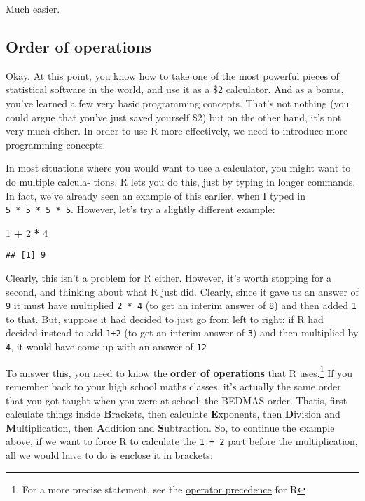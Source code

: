 \documentclass[]{book}
\newenvironment{Shaded}{\begin{snugshade}}{\end{snugshade}}
\newcommand{\DecValTok}[1]{\textcolor[rgb]{0.00,0.00,0.81}{#1}}
\newcommand{\OperatorTok}[1]{\textcolor[rgb]{0.81,0.36,0.00}{\textbf{#1}}}
\newcommand{\StringTok}[1]{\textcolor[rgb]{0.31,0.60,0.02}{#1}}
\let\rmarkdownfootnote\footnote%
\def\footnote{\protect\rmarkdownfootnote}
\begin{document}
Much easier.

\hypertarget{order-of-operations}{%
\subsection{Order of operations}\label{order-of-operations}}

Okay. At this point, you know how to take one of the most powerful pieces of statistical software in the world, and use it as a \$2 calculator. And as a bonus, you've learned a few very basic programming concepts. That's not nothing (you could argue that you've just saved yourself \$2) but on the other hand, it's not very much either. In order to use R more effectively, we need to introduce more programming concepts.

In most situations where you would want to use a calculator, you might want to do multiple calcula- tions. R lets you do this, just by typing in longer commands. In fact, we've already seen an example of this earlier, when I typed in \texttt{5\ *\ 5\ *\ 5\ *\ 5}. However, let's try a slightly different example:

\begin{Shaded}
\begin{Highlighting}[]
\DecValTok{1} \OperatorTok{+}\StringTok{ }\DecValTok{2} \OperatorTok{*}\StringTok{ }\DecValTok{4} 
\end{Highlighting}
\end{Shaded}

\begin{verbatim}
## [1] 9
\end{verbatim}

Clearly, this isn't a problem for R either. However, it's worth stopping for a second, and thinking about what R just did. Clearly, since it gave us an answer of \texttt{9} it must have multiplied \texttt{2\ *\ 4} (to get an interim answer of \texttt{8}) and then added \texttt{1} to that. But, suppose it had decided to just go from left to right: if R had decided instead to add \texttt{1+2} (to get an interim answer of \texttt{3}) and then multiplied by \texttt{4}, it would have come up with an answer of \texttt{12}

To answer this, you need to know the \textbf{order of operations} that R uses.\footnote{For a more precise statement, see the \href{http://stat.ethz.ch/R-manual/R-devel/library/base/html/Syntax.html}{operator precedence} for R} If you remember back to your high school maths classes, it's actually the same order that you got taught when you were at school: the BEDMAS order. Thatis, first calculate things inside \textbf{B}rackets, then calculate \textbf{E}xponents, then \textbf{D}ivision and \textbf{M}ultiplication, then \textbf{A}ddition and \textbf{S}ubtraction. So, to continue the example above, if we want to force R to calculate the \texttt{1\ +\ 2} part before the multiplication, all we would have to do is enclose it in brackets:
\end{document}
